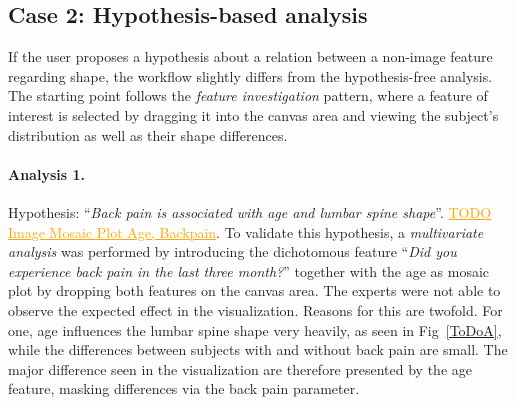 \documentclass[journal]{style/vgtc} 			          %
\newcommand{\com}[1]{\textcolor{orange}{\uline{#1}}}
\begin{document}
\subsection{Case 2: Hypothesis-based analysis}
If the user proposes a hypothesis about a relation between a non-image feature regarding shape, the workflow slightly differs from the hypothesis-free analysis.
%
The starting point follows the \emph{feature investigation} pattern, where a feature of interest is selected by dragging it into the canvas area and viewing the subject's distribution as well as their shape differences.
% 
\paragraph{Analysis 1.}
Hypothesis: ``\emph{Back pain is associated with age and lumbar spine shape}''.
\com{TODO Image Mosaic Plot Age, Backpain}.
%
To validate this hypothesis, a \emph{multivariate analysis} was performed by introducing the dichotomous feature ``\emph{Did you experience back pain in the last three month?}'' together with the age as mosaic plot by dropping both features on the canvas area.
%
The experts were not able to observe the expected effect in the visualization.
%
Reasons for this are twofold.
%
For one, age influences the lumbar spine shape very heavily, as seen in Fig~\ref{ToDoA}, while the differences between subjects with and without back pain are small.
%
The major difference seen in the visualization are therefore presented by the age feature, masking differences via the back pain parameter.
\end{document}
